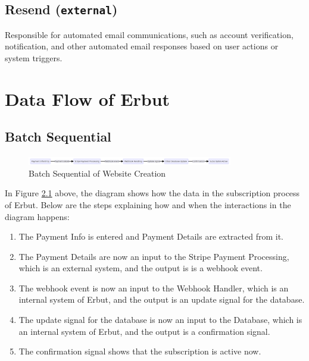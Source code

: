 \documentclass[a4paper]{report}
\begin{document}
\section{Resend (\texttt{external})}

Responsible for automated email communications, such as account verification, notification, and other automated email responses based on user actions or system triggers.

\chapter{Data Flow of Erbut}

\section{Batch Sequential}

\begin{figure}[h!]
    \centering
    \includegraphics[width=0.8\textwidth]{images/data-flow/user-subscription-batch-sequential.png}
    \caption{Batch Sequential of Website Creation}
    \label{fig:batch-sequential-user-subscription}
\end{figure}

In Figure \ref{fig:batch-sequential-user-subscription} above, the diagram shows how the data in the subscription process of Erbut. Below are the steps explaining how and when the interactions in the diagram happens:

\begin{enumerate}
    \item The Payment Info is entered and Payment Details are extracted from it.
    \item The Payment Details are now an input to the Stripe Payment Processing, which is an external system, and the output is is a webhook event.
    \item The webhook event is now an input to the Webhook Handler, which is an internal system of Erbut, and the output is an update signal for the database.
    \item The update signal for the database is now an input to the Database, which is an internal system of Erbut, and the output is a confirmation signal.
    \item The confirmation signal shows that the subscription is active now.
\end{enumerate}
\end{document}
